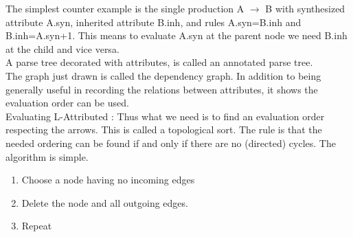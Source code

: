 \documentclass[a4paper,12pt]{article}
\begin{document}
The simplest counter example is the single production A $\rightarrow$ B with synthesized attribute A.syn, inherited attribute B.inh, and rules A.syn=B.inh and B.inh=A.syn+1. This means to evaluate A.syn at the parent node we need B.inh at the child and vice versa.\\
A parse tree decorated with attributes, is called an annotated parse tree.\\
The graph just drawn is called the dependency graph. In addition to being generally useful in recording the relations between attributes, it shows the evaluation order can be used. \\
Evaluating L-Attributed :
Thus what we need is to find an evaluation order respecting the arrows. This is called a topological sort. The rule is that the needed ordering can be found if and only if there are no (directed) cycles. The algorithm is simple.
\begin{enumerate}
\item Choose a node having no incoming edges 
\item Delete the node and all outgoing edges.
\item Repeat
\end{enumerate}
\end{document}
